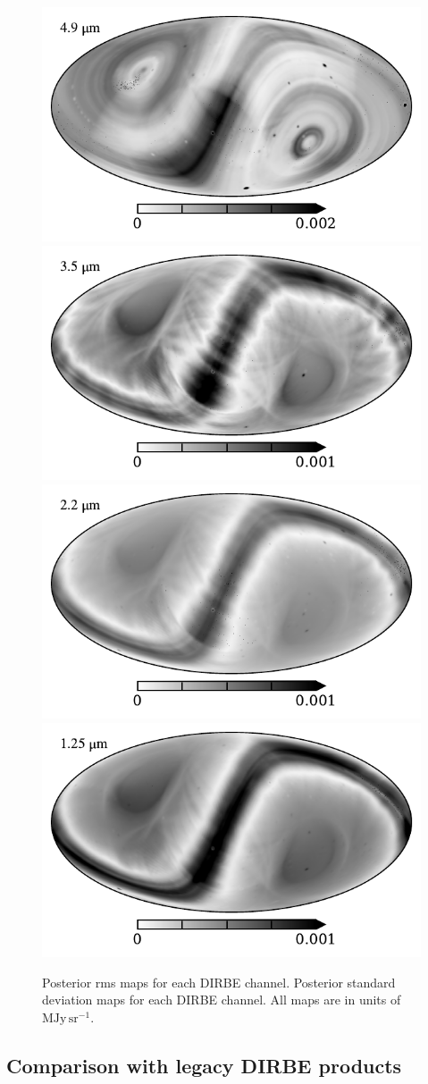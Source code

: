 \documentclass{aa}
\begin{document}
\begin{figure}
  \includegraphics[width=0.39\linewidth]{figs/std_04.pdf}         
  \includegraphics[width=0.39\linewidth]{figs/std_03.pdf}\\
  \includegraphics[width=0.39\linewidth]{figs/std_02.pdf}
  \includegraphics[width=0.39\linewidth]{figs/std_01.pdf}       
  \caption{Posterior rms maps for each DIRBE channel.  Posterior standard deviation maps for each DIRBE channel. All maps are in units of $\mathrm{MJy\,sr^{-1}}$.}
  \label{fig:rms}
\end{figure}






\subsection{Comparison with legacy DIRBE products}


\end{document}

